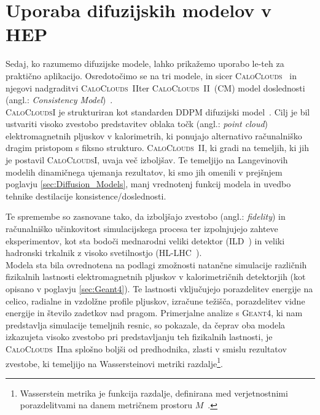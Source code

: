 \documentclass[12pt, a4paper]{article}
\newcommand{\geant}{\textsc{Geant4}\xspace \;}
\newcommand{\caloclouds}{\textsc{CaloClouds}\xspace \;}
\newcommand{\ccedm}{\textsc{CaloClouds~II}\xspace \;}
\newcommand{\cccm}{\textsc{CaloClouds~II~(CM)}\xspace}
\begin{document}


\newpage
\section{Uporaba difuzijskih modelov v HEP}

Sedaj, ko razumemo difuzijske modele, lahko prikažemo uporabo le-teh za praktično aplikacijo. Osredotočimo se na tri modele, in sicer \caloclouds~\cite{CaloClouds1} in njegovi nadgraditvi \ccedm  ter \cccm  model doslednosti (angl.: \textit{Consistency Model})~\cite{CaloClouds2}. \\

\caloclouds I je strukturiran kot standarden DDPM difuzijski model~\cite{DDPM}. Cilj je bil ustvariti visoko zvestobo predstavitev oblaka točk (angl.: \textit{point cloud}) elektromagnetnih pljuskov v kalorimetrih, ki ponujajo alternativo računalniško dragim pristopom s fiksno strukturo. \ccedm, ki gradi na temeljih, ki jih je postavil \caloclouds I, uvaja več izboljšav. Te temeljijo na Langevinovih modelih dinamičnega ujemanja rezultatov, ki smo jih omenili v prejšnjem poglavju \ref{sec:Diffusion_Models}, manj vrednotenj funkcij modela in uvedbo tehnike destilacije konsistence/doslednosti.

Te spremembe so zasnovane tako, da izboljšajo zvestobo (angl.: \textit{fidelity}) in računalniško učinkovitost simulacijskega procesa ter izpolnjujejo zahteve eksperimentov, kot sta bodoči mednarodni veliki detektor (ILD~\cite{ILD}) in veliki hadronski trkalnik z visoko svetilnostjo (HL-LHC~\cite{HL-LHC}). \\

Modela sta bila ovrednotena na podlagi zmožnosti natančne simulacije različnih fizikalnih lastnosti elektromagnetnih pljuskov v kalorimetričnih detektorjih (kot opisano v poglavju \ref{sec:Geant4}). Te lastnosti vključujejo porazdelitev energije na celico, radialne in vzdolžne profile pljuskov, izračune težišča, porazdelitev vidne energije in število zadetkov nad pragom. Primerjalne analize s \geant, ki nam predstavlja simulacije temeljnih resnic, so pokazale, da čeprav oba modela izkazujeta visoko zvestobo pri predstavljanju teh fizikalnih lastnosti, je \ccedm  na splošno boljši od predhodnika, zlasti v smislu rezultatov zvestobe, ki temeljijo na Wassersteinovi metriki razdalje\footnote{Wasserstein metrika je funkcija razdalje, definirana med verjetnostnimi porazdelitvami na danem metričnem prostoru $M$~\cite{Wasserstein}.}.
\end{document}
